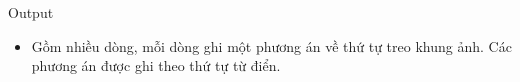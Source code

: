 Output
\begin{itemize}
	\item Gồm nhiều dòng, mỗi dòng ghi một phương án về thứ tự treo khung ảnh. Các phương án được ghi theo thứ tự từ điển.
\end{itemize}
